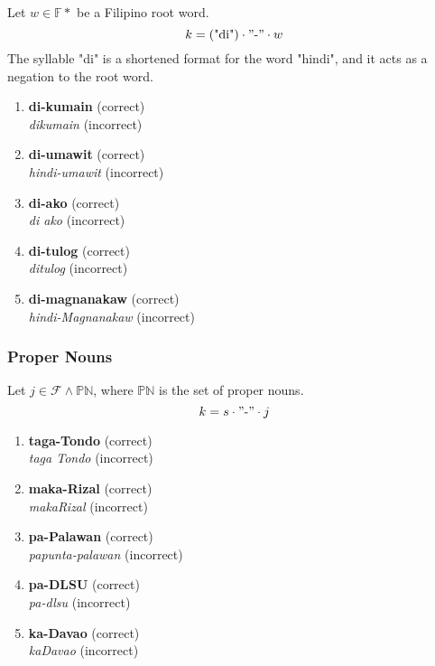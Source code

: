 Let \(w \in \mathbb{F}*\) be a Filipino root word.
\[
      k = (\text{"di"}) \cdot "\text{-}" \cdot w
\]
The syllable "di" is a shortened format for the word "hindi", and it acts as a negation to the root word.
\begin{example}
\end{example}
\begin{enumerate}
      \item \textbf{di-kumain} (correct) \\
            \textit{dikumain} (incorrect)
      \item \textbf{di-umawit} (correct) \\
            \textit{hindi-umawit} (incorrect)
      \item \textbf{di-ako} (correct) \\
            \textit{di ako} (incorrect)
      \item \textbf{di-tulog} (correct) \\
            \textit{ditulog} (incorrect)
      \item \textbf{di-magnanakaw} (correct) \\
            \textit{hindi-Magnanakaw} (incorrect)
\end{enumerate}

\subsubsection{Proper Nouns}
\label{proper_nouns_chapter}
Let \(j \in \mathcal{F} \wedge \mathbb{PN}\), where \(\mathbb{PN}\) is the set of proper nouns.
\[
      k = s \cdot "\text{-}" \cdot j
\]
\begin{example}
\end{example}
\begin{enumerate}
      \item \textbf{taga-Tondo} (correct) \\
            \textit{taga Tondo} (incorrect)
      \item \textbf{maka-Rizal} (correct) \\
            \textit{makaRizal} (incorrect)
      \item \textbf{pa-Palawan} (correct) \\
            \textit{papunta-palawan} (incorrect)
      \item \textbf{pa-DLSU} (correct) \\
            \textit{pa-dlsu} (incorrect)
      \item \textbf{ka-Davao} (correct) \\
            \textit{kaDavao} (incorrect)
\end{enumerate}

